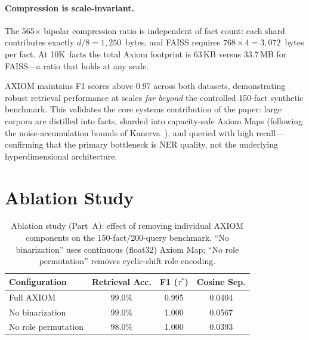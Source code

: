 \documentclass[11pt,a4paper]{article}
\begin{document}
\paragraph{Compression is scale-invariant.}
The 565$\times$ bipolar compression ratio is independent of fact
count: each shard contributes exactly $d/8 = 1{,}250$~bytes,
and FAISS requires $768 \times 4 = 3{,}072$~bytes per fact.
At 10K~facts the total Axiom footprint is 63\,KB versus
33.7\,MB for FAISS---a ratio that holds at any scale.

AXIOM maintains F1 scores above 0.97 across both datasets,
demonstrating robust retrieval performance at scales
\emph{far beyond} the controlled 150-fact synthetic benchmark.
This validates the core systems contribution of the paper:
large corpora are distilled into facts, sharded into
capacity-safe Axiom Maps (following the noise-accumulation
bounds of Kanerva~\cite{kanerva2009hyperdimensional}), and
queried with high recall---confirming that the primary
bottleneck is NER quality, not the underlying
hyperdimensional architecture.

\section{Ablation Study}
\label{sec:ablation}

\begin{table}[t]
    \centering
    \caption{Ablation study (Part~A): effect of removing individual
    AXIOM components on the 150-fact/200-query benchmark.
    ``No binarization'' uses continuous (float32) Axiom Map;
    ``No role permutation'' removes cyclic-shift role encoding.}
    \label{tab:ablation}
    \begin{tabular}{@{}lccc@{}}
        \toprule
        \textbf{Configuration} & \textbf{Retrieval Acc.}
        & \textbf{F1 ($\tau^{*}$)} & \textbf{Cosine Sep.} \\
        \midrule
        Full AXIOM          & 99.0\%  & 0.995  & 0.0404 \\
        No binarization     & 99.0\%  & 1.000  & 0.0567 \\
        No role permutation & 98.0\%  & 1.000  & 0.0393 \\
        \bottomrule
    \end{tabular}
\end{table}
\end{document}
